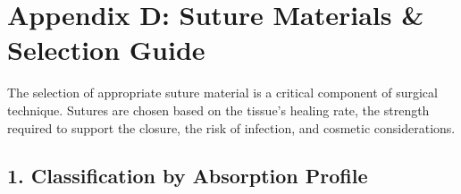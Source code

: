\chapter*{Appendix D: Suture Materials \& Selection Guide}

The selection of appropriate suture material is a critical component of surgical technique. Sutures are chosen based on the tissue's healing rate, the strength required to support the closure, the risk of infection, and cosmetic considerations.

\section*{1. Classification by Absorption Profile}


